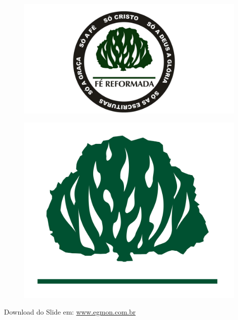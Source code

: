 \documentclass[14pt,aspectratio=169]{beamer}
\begin{document}
\logo{}
\small
\begin{frame}
 \begin{minipage}{0.45\linewidth}
  \begin{figure}
   \begin{center}
    \includegraphics[scale=0.2]{LogoReformada}
   \end{center}
  \end{figure}
 \end{minipage}
 \begin{minipage}{0.45\linewidth}
  \begin{figure}
   \begin{center}
    \includegraphics[scale=0.5]{Sarca}
   \end{center}
  \end{figure}
 \end{minipage}
\begin{center}
Download do Slide em: \href{www.egmon.com.br}{www.egmon.com.br}
\end{center}
\end{frame}
\end{document}
